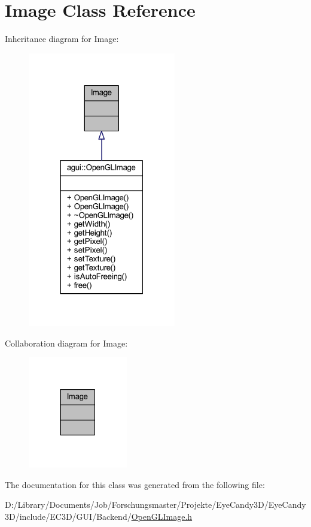 \hypertarget{class_image}{}\section{Image Class Reference}
\label{class_image}


Inheritance diagram for Image\+:
\nopagebreak
\begin{figure}[H]
\begin{center}
\leavevmode
\includegraphics[width=183pt]{class_image__inherit__graph}
\end{center}
\end{figure}


Collaboration diagram for Image\+:
\nopagebreak
\begin{figure}[H]
\begin{center}
\leavevmode
\includegraphics[width=123pt]{class_image__coll__graph}
\end{center}
\end{figure}


The documentation for this class was generated from the following file\+:\begin{DoxyCompactItemize}
\item 
D\+:/\+Library/\+Documents/\+Job/\+Forschungsmaster/\+Projekte/\+Eye\+Candy3\+D/\+Eye\+Candy3\+D/include/\+E\+C3\+D/\+G\+U\+I/\+Backend/\mbox{\hyperlink{_open_g_l_image_8h}{Open\+G\+L\+Image.\+h}}\end{DoxyCompactItemize}
